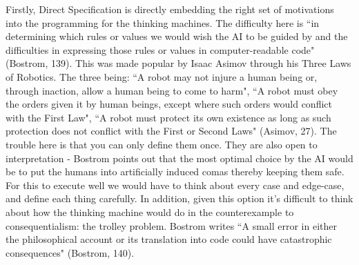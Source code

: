\documentclass[11pt, oneside]{article}
\begin{document}
\par 
Firstly, Direct Specification is directly embedding the right set of motivations into the programming for the thinking machines. The difficulty here is ``in determining which rules or values we would wish the AI to be guided by and the difficulties in expressing those rules or values in computer-readable code" (Bostrom, 139). 
This was made popular by Isaac Asimov through his Three Laws of Robotics. The three being: ``A robot may not injure a human being or, through inaction, allow a human being to come to harm", ``A robot must obey the orders given it by human beings, except where such orders would conflict with the First Law", ``A robot must protect its own existence as long as such protection does not conflict with the First or Second Laws" (Asimov, 27). 
The trouble here is that you can only define them once. They are also open to interpretation - Bostrom points out that the most optimal choice by the AI would be to put the humans into artificially induced comas thereby keeping them safe. For this to execute well we would have to think about every case and edge-case, and define each thing carefully. 
In addition, given this option it's difficult to think about how the thinking machine would do in the counterexample to consequentialism: the trolley problem. Bostrom writes ``A small error in either the philosophical account or its translation into code could have catastrophic consequences" (Bostrom, 140). 
\end{document}
